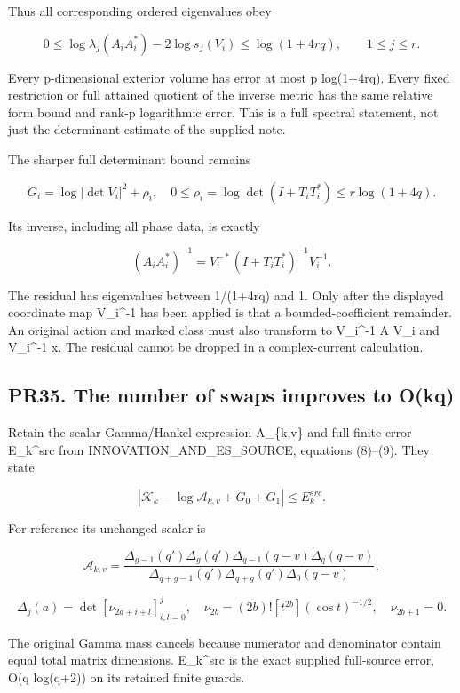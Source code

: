 \documentclass[11pt]{article}
\begin{document}
Thus all corresponding ordered eigenvalues obey

\[
0\le\log\lambda_j(A_iA_i^*)-2\log s_j(V_i)
\le\log(1+4rq),\qquad1\le j\le r.
\tag{PR40}
\]

Every p-dimensional exterior volume has error at most p log(1+4rq). Every fixed restriction or full attained quotient of the inverse metric has the same relative form bound and rank-p logarithmic error. This is a full spectral statement, not just the determinant estimate of the supplied note.

The sharper full determinant bound remains

\[
G_i=\log|\det V_i|^2+\rho_i,\quad
0\le\rho_i=\log\det(I+T_iT_i^*)\le r\log(1+4q).
\tag{PR41}
\]

Its inverse, including all phase data, is exactly

\[
(A_iA_i^*)^{-1}=V_i^{-*}(I+T_iT_i^*)^{-1}V_i^{-1}.
\]

The residual has eigenvalues between 1/(1+4rq) and 1. Only after the displayed coordinate map V\_i\^{}-1 has been applied is that a bounded-coefficient remainder. An original action and marked class must also transform to V\_i\^{}-1 A V\_i and V\_i\^{}-1 x. The residual cannot be dropped in a complex-current calculation.

\subsection{PR35. The number of swaps improves to O(kq)}\label{pr35.-the-number-of-swaps-improves-to-okq}

Retain the scalar Gamma/Hankel expression A\_\{k,v\} and full finite error E\_k\^{}src from INNOVATION\_AND\_ES\_SOURCE, equations (8)--(9). They state

\[
|\mathcal K_k-\log\mathcal A_{k,v}+G_0+G_1|\le E_k^{src}.
\tag{PR42}
\]

For reference its unchanged scalar is

\[
\mathcal A_{k,v}=
\frac{\Delta_{g-1}(q')\Delta_g(q')\Delta_{q-1}(q-v)\Delta_q(q-v)}
{\Delta_{q+g-1}(q')\Delta_{q+g}(q')\Delta_0(q-v)},
\]

\[
\Delta_j(a)=\det[\nu_{2a+i+l}]_{i,l=0}^j,\quad
\nu_{2b}=(2b)![t^{2b}](\cos t)^{-1/2},\quad\nu_{2b+1}=0.
\]

The original Gamma mass cancels because numerator and denominator contain equal total matrix dimensions. E\_k\^{}src is the exact supplied full-source error, O(q log(q+2)) on its retained finite guards.
\end{document}
